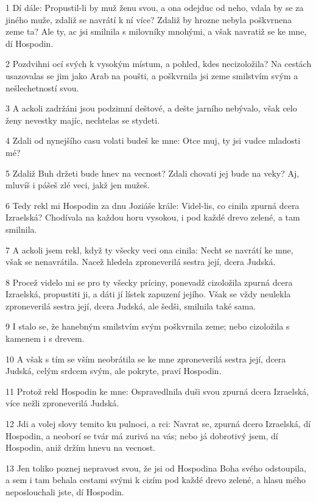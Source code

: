 \par 1 Dí dále: Propustil-li by muž ženu svou, a ona odejduc od neho, vdala by se za jiného muže, zdaliž se navrátí k ní více? Zdaliž by hrozne nebyla poškvrnena zeme ta? Ale ty, ac jsi smilnila s milovníky mnohými, a však navratiž se ke mne, dí Hospodin.
\par 2 Pozdvihni ocí svých k vysokým místum, a pohled, kdes necizoložila? Na cestách usazovalas se jim jako Arab na poušti, a poškvrnila jsi zeme smilstvím svým a nešlechetností svou.
\par 3 A ackoli zadržáni jsou podzimní deštové, a dešte jarního nebývalo, však celo ženy nevestky majíc, nechtelas se stydeti.
\par 4 Zdali od nynejšího casu volati budeš ke mne: Otce muj, ty jsi vudce mladosti mé?
\par 5 Zdaliž Buh držeti bude hnev na vecnost? Zdali chovati jej bude na veky? Aj, mluvíš i pášeš zlé veci, jakž jen mužeš.
\par 6 Tedy rekl mi Hospodin za dnu Joziáše krále: Videl-lis, co cinila zpurná dcera Izraelská? Chodívala na každou horu vysokou, i pod každé drevo zelené, a tam smilnila.
\par 7 A ackoli jsem rekl, když ty všecky veci ona cinila: Necht se navrátí ke mne, však se nenavrátila. Nacež hledela zproneverilá sestra její, dcera Judská.
\par 8 Procež videlo mi se pro ty všecky príciny, ponevadž cizoložila zpurná dcera Izraelská, propustiti ji, a dáti jí lístek zapuzení jejího. Však se vždy neulekla zproneverilá sestra její, dcera Judská, ale šedši, smilnila také sama.
\par 9 I stalo se, že hanebným smilstvím svým poškvrnila zeme; nebo cizoložila s kamenem i s drevem.
\par 10 A však s tím se vším neobrátila se ke mne zproneverilá sestra její, dcera Judská, celým srdcem svým, ale pokryte, praví Hospodin.
\par 11 Protož rekl Hospodin ke mne: Ospravedlnila duši svou zpurná dcera Izraelská, více nežli zproneverilá Judská.
\par 12 Jdi a volej slovy temito ku pulnoci, a rci: Navrat se, zpurná dcero Izraelská, dí Hospodin, a neoborí se tvár má zurivá na vás; nebo já dobrotivý jsem, dí Hospodin, aniž držím hnevu na vecnost.
\par 13 Jen toliko poznej nepravost svou, že jsi od Hospodina Boha svého odstoupila, a sem i tam behala cestami svými k cizím pod každé drevo zelené, a hlasu mého neposlouchali jste, dí Hospodin.
